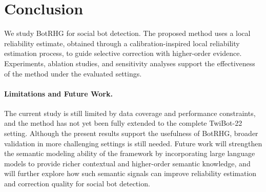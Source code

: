 \section{Conclusion}

We study BotRHG for social bot detection. The proposed method uses a local reliability estimate, obtained through a calibration-inspired local reliability estimation process, to guide selective correction with higher-order evidence. Experiments, ablation studies, and sensitivity analyses support the effectiveness of the method under the evaluated settings.

\paragraph{Limitations and Future Work.}
The current study is still limited by data coverage and performance constraints, and the method has not yet been fully extended to the complete TwiBot-22 setting. Although the present results support the usefulness of BotRHG, broader validation in more challenging settings is still needed. Future work will strengthen the semantic modeling ability of the framework by incorporating large language models to provide richer contextual and higher-order semantic knowledge, and will further explore how such semantic signals can improve reliability estimation and correction quality for social bot detection.
